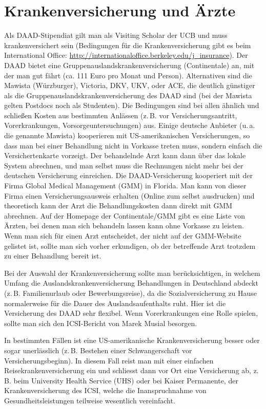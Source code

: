 \documentclass[a4paper]{scrreprt}
\begin{document}
\section{Krankenversicherung und Ärzte}

Als DAAD-Stipendiat gilt man als Visiting Scholar der UCB und muss krankenversichert sein 
(Bedingungen für die Krankenversicherung gibt es beim International Office: 
\url{http://internationaloffice.berkeley.edu/j\_insurance}). 
 Der DAAD bietet eine Gruppenauslandskrankenversicherung (Continentale) an, 
 mit der man gut fährt (ca. 111 Euro pro Monat und Person). 
Alternativen sind die Mawista (Würzburger), Victoria, DKV, UKV, oder ACE, die deutlich günstiger als die Gruppenauslandskrankenversicherung des DAAD sind (bei der Mawista gelten Postdocs noch als Studenten). Die Bedingungen sind bei allen ähnlich und schließen Kosten aus bestimmten Anlässen (z.\,B. vor Versicherungsantritt, Vorerkrankungen, Vorsorgeuntersuchungen) aus. Einige deutsche Anbieter (u.\,a. die genannte Mawista) kooperieren mit US-amerikanischen Versicherungen, so dass man bei einer Behandlung nicht in Vorkasse treten muss, sondern einfach die Versichertenkarte vorzeigt. Der behandelnde Arzt kann dann über das lokale System abrechnen, und man selbst muss die Rechnungen nicht mehr bei der deutschen Versicherung einreichen. Die DAAD-Versicherung kooperiert mit der Firma Global Medical Management (GMM) in Florida. Man kann von dieser Firma einen Versicherungsausweis erhalten (Online zum selbst ausdrucken) und theoretisch kann der Arzt die Behandlungskosten dann direkt mit GMM abrechnen. Auf der Homepage der Continentale/GMM gibt es eine Liste von Ärzten, bei denen man sich behandeln lassen kann ohne Vorkasse zu leisten.
Wenn man sich für einen Arzt entscheidet, der nicht auf der GMM-Website gelistet ist, sollte man sich vorher erkundigen, ob der betreffende Arzt trotzdem zu einer Behandlung bereit ist.

Bei der Auswahl der Krankenversicherung sollte man berücksichtigen, in welchem Umfang die Auslandskrankenversicherung Behandlungen in Deutschland abdeckt (z.\,B. Familienurlaub oder Bewerbungsreise), da die Sozialversicherung zu Hause normalerweise für die Dauer des Auslandsaufenthalts ruht. Hier ist die Versicherung des DAAD sehr flexibel. Wenn Vorerkrankungen eine Rolle spielen, sollte man sich den ICSI-Bericht von Marek Musial besorgen.

In bestimmten Fällen ist eine US-amerikanische Krankenversicherung besser oder sogar unerlässlich (z.\,B. Bestehen einer Schwangerschaft vor Versicherungsbeginn). In diesem Fall reist man mit einer einfachen Reisekrankenversicherung ein und schliesst dann vor Ort eine Versicherung ab, z.\,B. beim University Health Service (UHS) oder bei Kaiser Permanente, der Krankenversicherung des ICSI, welche die Inanspruchnahme von Gesundheitsleistungen teilweise wesentlich vereinfacht.
\end{document}
